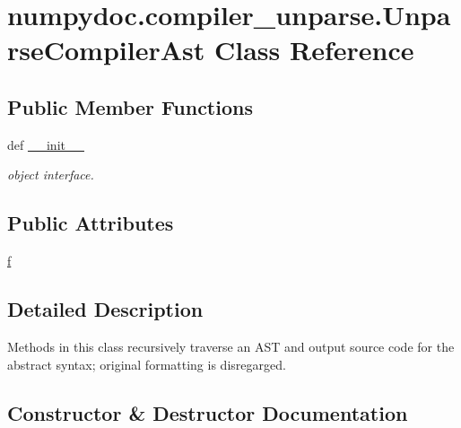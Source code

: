 \hypertarget{classnumpydoc_1_1compiler__unparse_1_1UnparseCompilerAst}{}\section{numpydoc.\+compiler\+\_\+unparse.\+Unparse\+Compiler\+Ast Class Reference}
\label{classnumpydoc_1_1compiler__unparse_1_1UnparseCompilerAst}
\subsection*{Public Member Functions}
\begin{DoxyCompactItemize}
\item 
def \hyperlink{classnumpydoc_1_1compiler__unparse_1_1UnparseCompilerAst_a631a33f091f801e0ddc73aef0ea61b37}{\+\_\+\+\_\+init\+\_\+\+\_\+}
\begin{DoxyCompactList}\small\item\em object interface. \end{DoxyCompactList}\end{DoxyCompactItemize}
\subsection*{Public Attributes}
\begin{DoxyCompactItemize}
\item 
\hyperlink{classnumpydoc_1_1compiler__unparse_1_1UnparseCompilerAst_ab305ec80b4444a2cec70f52f38edd9f0}{f}
\end{DoxyCompactItemize}


\subsection{Detailed Description}
\begin{DoxyVerb}Methods in this class recursively traverse an AST and
    output source code for the abstract syntax; original formatting
    is disregarged.
\end{DoxyVerb}
 

\subsection{Constructor \& Destructor Documentation}
\hypertarget{classnumpydoc_1_1compiler__unparse_1_1UnparseCompilerAst_a631a33f091f801e0ddc73aef0ea61b37}{}
